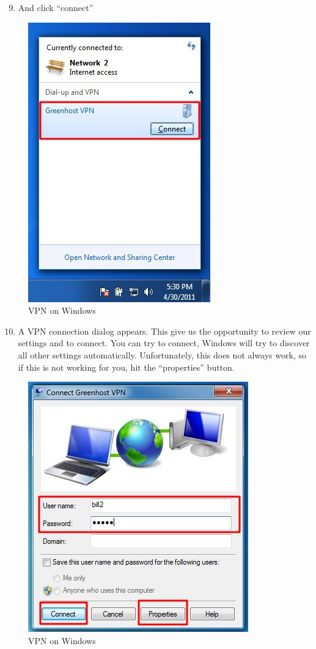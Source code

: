 \begin{enumerate}[1.]
\setcounter{enumi}{8}
\item
  And click ``connect''
\end{enumerate}
\begin{figure}[htbp]
\centering
\includegraphics{vpn_windows_08.jpg}
\caption{VPN on Windows}
\end{figure}

\begin{enumerate}[1.]
\setcounter{enumi}{9}
\item
  A VPN connection dialog appears. This give us the opportunity to
  review our settings and to connect. You can try to connect, Windows
  will try to discover all other settings automatically. Unfortunately,
  this does not always work, so if this is not working for you, hit the
  ``properties'' button.
\end{enumerate}
\begin{figure}[htbp]
\centering
\includegraphics{vpn_windows_09.jpg}
\caption{VPN on Windows}
\end{figure}

